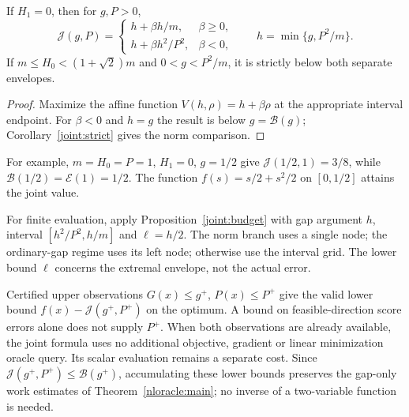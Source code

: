 \begin{corollary}\label{joint:constant}
If $H_1=0$, then for $g,P>0$,
\begin{equation}\label{joint:constant-formula}
 \mathcal J(g,P)=
 \begin{cases}
 h+\beta h/m,&\beta\ge0,\\
 h+\beta h^2/P^2,&\beta<0,
 \end{cases}
 \qquad h=\min\{g,P^2/m\}.
\end{equation}
If $m\le H_0<(1+\sqrt2)m$ and $0<g<P^2/m$, it is strictly below
both separate envelopes.
\end{corollary}
\begin{proof}
Maximize the affine function $V(h,\rho)=h+\beta\rho$ at the appropriate
interval endpoint. For $\beta<0$ and $h=g$ the result is below
$g=\mathcal B(g)$; Corollary~\ref{joint:strict} gives the norm comparison.
\end{proof}
For example, $m=H_0=P=1$, $H_1=0$, $g=1/2$ give
$\mathcal J(1/2,1)=3/8$, while $\mathcal B(1/2)=\mathcal E(1)=1/2$.
The function $f(s)=s/2+s^2/2$ on $[0,1/2]$ attains the joint value.

For finite evaluation, apply Proposition~\ref{joint:budget} with gap
argument $h$, interval $[h^2/P^2,h/m]$ and $\ell=h/2$.
The norm branch uses a single node; the ordinary-gap regime uses its
left node; otherwise use the interval grid.
The lower bound $\ell$ concerns the extremal envelope, not the actual error.

Certified upper observations $G(x)\le g^+$, $P(x)\le P^+$ give the
valid lower bound $f(x)-\mathcal J(g^+,P^+)$ on the optimum.
A bound on feasible-direction score errors alone does not supply $P^+$.
When both observations are already available, the joint formula uses no
additional objective, gradient or linear minimization oracle query.
Its scalar evaluation remains a separate cost.
Since $\mathcal J(g^+,P^+)\le\mathcal B(g^+)$, accumulating these lower
bounds preserves the gap-only work estimates of Theorem~\ref{nloracle:main};
no inverse of a two-variable function is needed.
